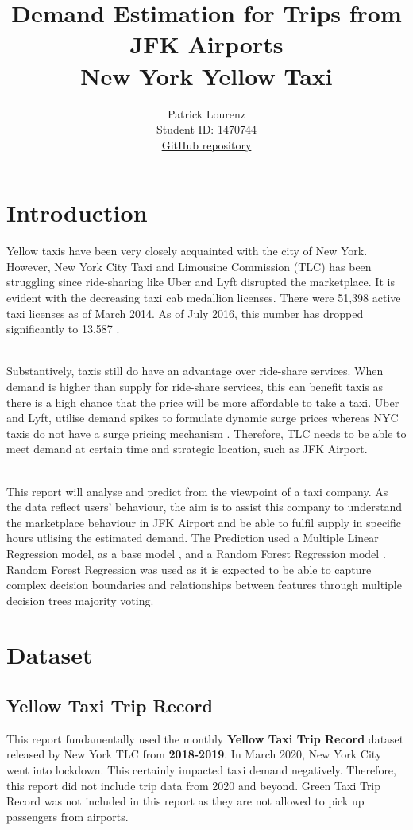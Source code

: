 \documentclass[11pt]{article}
\title{\textbf{Demand Estimation for Trips from JFK Airports} \\ {New York Yellow Taxi}}
\author{
Patrick Lourenz \\
Student ID: 1470744 \\
\href{https://github.com/MAST30034-Applied-Data-Science/mast30034-project-1-pl0203/}{GitHub repository}
}
\begin{document}
\maketitle

\section{Introduction}

Yellow taxis have been very closely acquainted with the city of New York. However, New York City Taxi and Limousine Commission (TLC) has been struggling since ride-sharing like Uber and Lyft disrupted the marketplace. It is evident with the decreasing taxi cab medallion licenses. There were 51,398 active taxi licenses as of March 2014. As of July 2016, this number has dropped significantly to 13,587 \cite{taxi1}. 

\\
Substantively, taxis still do have an advantage over ride-share services. When demand is higher than supply for ride-share services, this can benefit taxis as there is a high chance that the price will be more affordable to take a taxi. Uber and Lyft, utilise demand spikes to formulate dynamic surge prices whereas NYC taxis do not have a surge pricing mechanism \cite{taxistrive}. Therefore, TLC needs to be able to meet demand at certain time and strategic location, such as JFK Airport.  

\\
This report will analyse and predict from the viewpoint of a taxi company. As the data reflect users' behaviour, the aim is to assist this company to understand the marketplace behaviour in JFK Airport and be able to fulfil supply in specific hours utlising the estimated demand. The Prediction used a Multiple Linear Regression model, as a base model \cite{mlr}, and a Random Forest Regression model \cite{rf}. Random Forest Regression was used as it is expected to be able to capture complex decision boundaries and relationships between features through multiple decision trees majority voting.
\\

\section{Dataset}
\subsection{Yellow Taxi Trip Record}
This report fundamentally used the monthly \textbf{Yellow Taxi Trip Record} dataset released by New York TLC from \textbf{2018-2019}\cite{nyctaxi}. In March 2020, New York City went into lockdown. This certainly impacted taxi demand negatively. Therefore, this report did not include trip data from 2020 and beyond. Green Taxi Trip Record was not included in this report as they are not allowed to pick up passengers from airports. 
\end{document}
